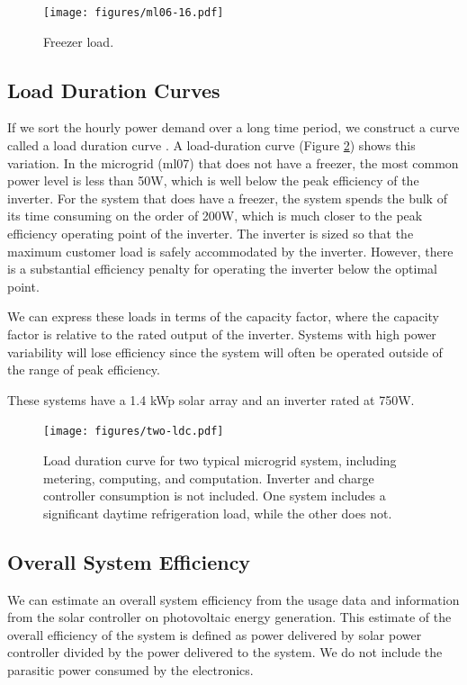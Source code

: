 \documentclass[conference]{IEEEtran}
\begin{document}
\begin{figure}[]
\begin{center}
\texttt{[image: figures/ml06-16.pdf]}
\end{center}
\caption{Freezer load.}
\label{freezer}
\end{figure}


\subsection{Load Duration Curves}
If we sort the hourly power demand over a long time period, we
construct a curve called a load duration curve \cite{REEPS}.
A load-duration curve (Figure \ref{ldc}) shows this variation.
In the microgrid (ml07) that does not have a freezer, the most common
power level is less than 50W, which is well below the peak
efficiency of the inverter.
For the system that does have a freezer, the system spends the bulk
of its time consuming on the order of 200W, which is much closer
to the peak efficiency operating point of the inverter.
The inverter is sized so that the maximum customer load is safely
accommodated by the inverter.
However, there is a substantial efficiency penalty for operating the
inverter below the optimal point.

We can express these loads in terms of the capacity factor,
where the capacity factor is relative to the rated output
of the inverter.
Systems with high power variability will lose efficiency since
the system will often be operated outside of the range of
peak efficiency.


These systems have a 1.4 kWp solar array and an inverter rated
at 750W.

\begin{figure}[h]
\begin{center}
\texttt{[image: figures/two-ldc.pdf]}
\end{center}
\caption{Load duration curve for two typical microgrid system,
including metering, computing, and computation.
Inverter and charge controller consumption is not included.
One system includes a significant daytime refrigeration load,
while the other does not.
}
\label{ldc}
\end{figure}

\subsection{Overall System Efficiency}

We can estimate an overall system efficiency from the
usage data and information from the solar controller
on photovoltaic energy generation.
This estimate of the overall efficiency of the system
is defined as power delivered by solar
power controller divided by the power delivered to the system.
We do not include the parasitic power consumed by the electronics.
\end{document}
